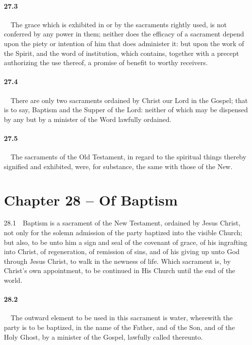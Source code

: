 \paragraph{27.3}\ \ The grace which is exhibited in or by the sacraments rightly used, is not conferred by any power in them; neither does the efficacy of a sacrament depend upon the piety or intention of him that does administer it: but upon the work of the Spirit, and the word of institution, which contains, together with a precept authorizing the use thereof, a promise of benefit to worthy receivers.   
\bigskip
\paragraph{27.4}\ \ There are only two sacraments ordained by Christ our Lord in the Gospel; that is to say, Baptism and the Supper of the Lord: neither of which may be dispensed by any but by a minister of the Word lawfully ordained.   
\bigskip
\paragraph{27.5}\ \ The sacraments of the Old Testament, in regard to the spiritual things thereby signified and exhibited, were, for substance, the same with those of the New.  

\section{Chapter 28 -- Of Baptism} 28.1\ \ Baptism is a sacrament of the New Testament, ordained by Jesus Christ, not only for the solemn admission of the party baptized into the visible Church; but also, to be unto him a sign and seal of the covenant of grace, of his ingrafting into Christ, of regeneration, of remission of sins, and of his giving up unto God through Jesus Christ, to walk in the newness of life. Which sacrament is, by Christ's own appointment, to be continued in His Church until the end of the world.   
\bigskip
\paragraph{28.2}\ \ The outward element to be used in this sacrament is water, wherewith the party is to be baptized, in the name of the Father, and of the Son, and of the Holy Ghost, by a minister of the Gospel, lawfully called thereunto.   
\bigskip
